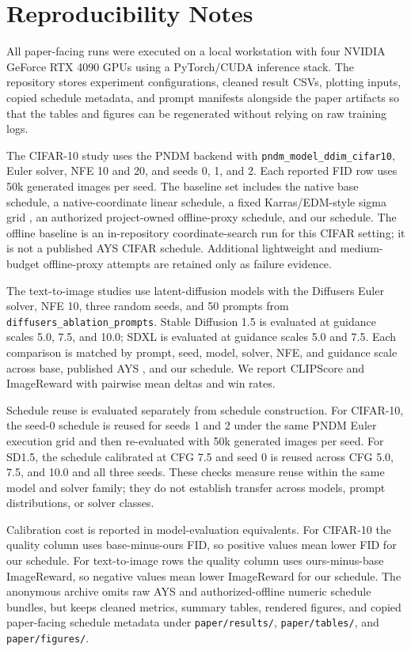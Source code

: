 \section{Reproducibility Notes}

All paper-facing runs were executed on a local workstation with four NVIDIA
GeForce RTX 4090 GPUs using a PyTorch/CUDA inference stack. The repository
stores experiment configurations, cleaned result CSVs, plotting inputs, copied
schedule metadata, and prompt manifests alongside the paper artifacts so that
the tables and figures can be regenerated without relying on raw training logs.

The CIFAR-10 study uses the PNDM backend \citep{liu2022pndm} with
\texttt{pndm\_model\_ddim\_cifar10}, Euler solver, NFE 10 and 20, and seeds 0,
1, and 2. Each reported FID row uses 50k generated images per seed. The
baseline set includes the native base schedule, a native-coordinate linear
schedule, a fixed Karras/EDM-style sigma grid \citep{karras2022edm}, an
authorized project-owned offline-proxy schedule, and our schedule. The offline
baseline is an in-repository coordinate-search run for this CIFAR setting; it
is not a published AYS CIFAR schedule. Additional lightweight and medium-budget
offline-proxy attempts are retained only as failure evidence.

The text-to-image studies use latent-diffusion models \citep{rombach2022ldm}
with the Diffusers Euler solver, NFE 10, three random seeds, and 50 prompts
from \texttt{diffusers\_ablation\_prompts}. Stable Diffusion 1.5 is evaluated
at guidance scales 5.0, 7.5, and 10.0; SDXL is evaluated at guidance scales 5.0
and 7.5. Each comparison is matched by prompt, seed, model, solver, NFE, and
guidance scale across base, published AYS \citep{sabour2024ays}, and our
schedule. We report CLIPScore \citep{hessel2022clipscore,radford2021clip} and
ImageReward \citep{xu2023imagereward} with pairwise mean deltas and win rates.

Schedule reuse is evaluated separately from schedule construction. For
CIFAR-10, the seed-0 schedule is reused for seeds 1 and 2 under the same PNDM
Euler execution grid and then re-evaluated with 50k generated images per seed.
For SD1.5, the schedule calibrated at CFG 7.5 and seed 0 is reused across CFG
5.0, 7.5, and 10.0 and all three seeds. These checks measure reuse within the
same model and solver family; they do not establish transfer across models,
prompt distributions, or solver classes.

Calibration cost is reported in model-evaluation equivalents. For CIFAR-10 the
quality column uses base-minus-ours FID, so positive values mean lower FID for
our schedule. For text-to-image rows the quality column uses ours-minus-base
ImageReward, so negative values mean lower ImageReward for our schedule. The
anonymous archive omits raw AYS and authorized-offline numeric schedule bundles,
but keeps cleaned metrics, summary tables, rendered figures, and copied
paper-facing schedule metadata under \texttt{paper/results/},
\texttt{paper/tables/}, and \texttt{paper/figures/}.
